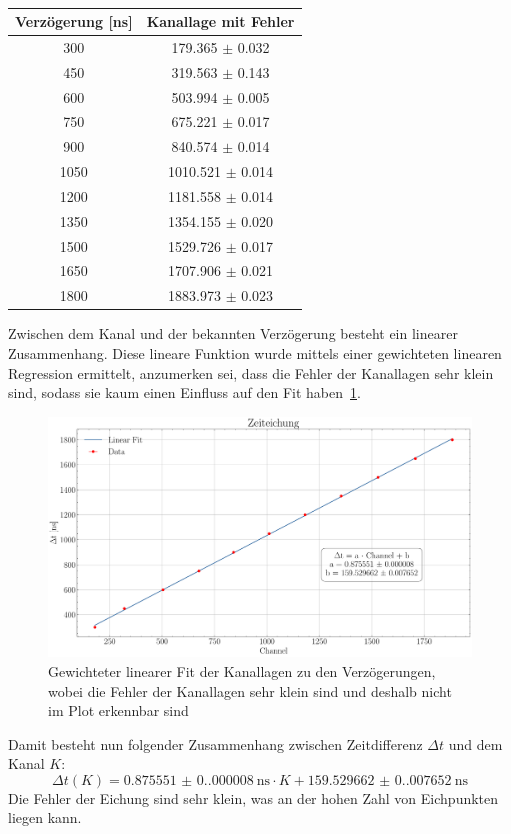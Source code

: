 \documentclass[12pt,a4paper,ngerman]{report}
\begin{document}
	\begin{table}
		\centering
		\begin{tabular}{cc}
			\toprule[1.5pt]
			Verzögerung [\si{\nano\s}]& Kanallage mit Fehler\\
			\midrule
			300	 & 179.365 $\pm$ 0.032 \\
			450	 & 319.563 $\pm$ 0.143 \\
			600	 & 503.994 $\pm$ 0.005 \\
			750	 & 675.221 $\pm$ 0.017 \\
			900	 & 840.574 $\pm$ 0.014 \\
			1050	 & 1010.521 $\pm$ 0.014 \\
			1200	 & 1181.558 $\pm$ 0.014 \\
			1350	 & 1354.155 $\pm$ 0.020 \\
			1500	 & 1529.726 $\pm$ 0.017 \\
			1650	 & 1707.906 $\pm$ 0.021 \\
			1800	 & 1883.973 $\pm$ 0.023 \\

			
			\bottomrule[1.5pt]
		\end{tabular}
		\caption{}\label{table:TimeFits}
	\end{table}
	Zwischen dem Kanal und der bekannten Verzögerung besteht ein linearer Zusammenhang. Diese lineare Funktion wurde mittels einer gewichteten linearen Regression ermittelt, anzumerken sei, dass die Fehler der Kanallagen sehr klein sind, sodass sie kaum einen Einfluss auf den Fit haben~\ref{img:timeLinearFit}.
	\begin{figure}[ht]
		\centering
		\includegraphics[width=\textwidth]{Bilder/timeLinearFit.pdf}		
		\caption[linearer Fit der Kanallagen]{Gewichteter linearer Fit der Kanallagen zu den Verzögerungen, wobei die Fehler der Kanallagen sehr klein sind und deshalb nicht im Plot erkennbar sind}\label{img:timeLinearFit}
	\end{figure}
	Damit besteht nun folgender Zusammenhang zwischen Zeitdifferenz $\Delta t$ und dem Kanal $K$:
	\begin{equation}
		\Delta t(K) = \SI{0.875551(0.000008)}{\nano \s} \cdot K + \SI{159.529662(0.007652)}{\nano \s}
	\end{equation}
	Die Fehler der Eichung sind sehr klein, was an der hohen Zahl von Eichpunkten liegen kann.
\end{document}
